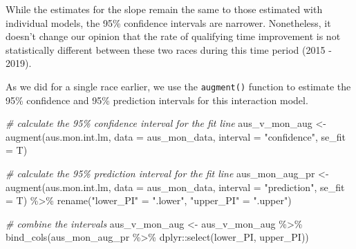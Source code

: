 \documentclass[
]{book}
\newenvironment{Shaded}{\begin{snugshade}}{\end{snugshade}}
\newcommand{\AttributeTok}[1]{\textcolor[rgb]{0.77,0.63,0.00}{#1}}
\newcommand{\CommentTok}[1]{\textcolor[rgb]{0.56,0.35,0.01}{\textit{#1}}}
\newcommand{\FunctionTok}[1]{\textcolor[rgb]{0.00,0.00,0.00}{#1}}
\newcommand{\NormalTok}[1]{#1}
\newcommand{\OtherTok}[1]{\textcolor[rgb]{0.56,0.35,0.01}{#1}}
\newcommand{\SpecialCharTok}[1]{\textcolor[rgb]{0.00,0.00,0.00}{#1}}
\newcommand{\StringTok}[1]{\textcolor[rgb]{0.31,0.60,0.02}{#1}}
\begin{document}
While the estimates for the slope remain the same to those estimated with individual models, the 95\% confidence intervals are narrower. Nonetheless, it doesn't change our opinion that the rate of qualifying time improvement is not statistically different between these two races during this time period (2015 - 2019).

As we did for a single race earlier, we use the \texttt{augment()} function to estimate the 95\% confidence and 95\% prediction intervals for this interaction model.

\begin{Shaded}
\begin{Highlighting}[]
\CommentTok{\# calculate the 95\% confidence interval for the fit line}
\NormalTok{aus\_v\_mon\_aug }\OtherTok{\textless{}{-}} \FunctionTok{augment}\NormalTok{(aus.mon.int.lm, }\AttributeTok{data =}\NormalTok{ aus\_mon\_data, }\AttributeTok{interval =} \StringTok{"confidence"}\NormalTok{, }\AttributeTok{se\_fit =}\NormalTok{ T)}

\CommentTok{\# calculate the 95\% prediction interval for the fit line}
\NormalTok{aus\_mon\_aug\_pr }\OtherTok{\textless{}{-}} \FunctionTok{augment}\NormalTok{(aus.mon.int.lm, }\AttributeTok{data =}\NormalTok{ aus\_mon\_data, }\AttributeTok{interval =} \StringTok{"prediction"}\NormalTok{, }\AttributeTok{se\_fit =}\NormalTok{ T) }\SpecialCharTok{\%\textgreater{}\%}
\FunctionTok{rename}\NormalTok{(}\StringTok{"lower\_PI"} \OtherTok{=} \StringTok{".lower"}\NormalTok{, }\StringTok{"upper\_PI"} \OtherTok{=} \StringTok{".upper"}\NormalTok{)}

\CommentTok{\# combine the intervals}
\NormalTok{aus\_v\_mon\_aug }\OtherTok{\textless{}{-}}\NormalTok{ aus\_v\_mon\_aug }\SpecialCharTok{\%\textgreater{}\%}
\FunctionTok{bind\_cols}\NormalTok{(aus\_mon\_aug\_pr }\SpecialCharTok{\%\textgreater{}\%}\NormalTok{ dplyr}\SpecialCharTok{::}\FunctionTok{select}\NormalTok{(lower\_PI, upper\_PI))}


\end{Highlighting}
\end{Shaded}
\end{document}

